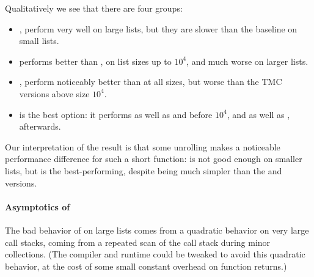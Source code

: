 Qualitatively we see that there are four groups:
\begin{itemize}
\item {},  perform very well on large lists, but they
  are slower than the baseline on small lists.
\item {} performs better than ,  on list sizes up to $10^4$, and much worse on larger lists.
\item {},  perform noticeably better than  at all sizes,
  but worse than the TMC versions above size $10^4$.
\item {} is the best option: it performs as well as  and  before $10^4$, and as well as ,  afterwards.
\end{itemize}
Our interpretation of the result is that some unrolling makes a noticeable performance difference for such a short function:  is not good enough on smaller lists, but  is the best-performing, despite being much simpler than the  and  versions.

\paragraph{Asymptotics of } The bad behavior of  on large lists comes from a quadratic behavior on very large call stacks, coming from a repeated scan of the call stack during minor collections. (The \OCaml compiler and runtime could be tweaked to avoid this quadratic behavior, at the cost of some small constant overhead on function returns.)


